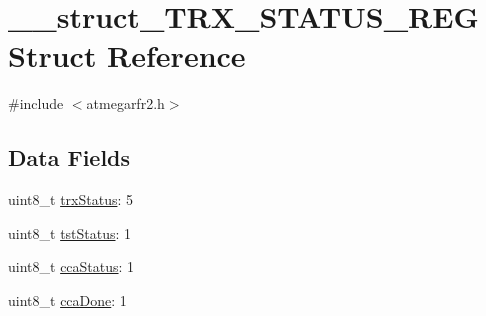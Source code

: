 \hypertarget{struct____struct___t_r_x___s_t_a_t_u_s___r_e_g}{\section{\-\_\-\-\_\-struct\-\_\-\-T\-R\-X\-\_\-\-S\-T\-A\-T\-U\-S\-\_\-\-R\-E\-G Struct Reference}
\label{struct____struct___t_r_x___s_t_a_t_u_s___r_e_g}
}


{\ttfamily \#include $<$atmegarfr2.\-h$>$}

\subsection*{Data Fields}
\begin{DoxyCompactItemize}
\item 
uint8\-\_\-t \hyperlink{struct____struct___t_r_x___s_t_a_t_u_s___r_e_g_a8a44137b47acd9ac6b0350202b596f92}{trx\-Status}\-: 5
\item 
uint8\-\_\-t \hyperlink{struct____struct___t_r_x___s_t_a_t_u_s___r_e_g_a6b86830580f6d63acfc01a521afe0c8e}{tst\-Status}\-: 1
\item 
uint8\-\_\-t \hyperlink{struct____struct___t_r_x___s_t_a_t_u_s___r_e_g_a145af3ac13d1694d2f85a68f7b4f1188}{cca\-Status}\-: 1
\item 
uint8\-\_\-t \hyperlink{struct____struct___t_r_x___s_t_a_t_u_s___r_e_g_a9259484131ca857d12f6cf7e816d1730}{cca\-Done}\-: 1
\end{DoxyCompactItemize}


